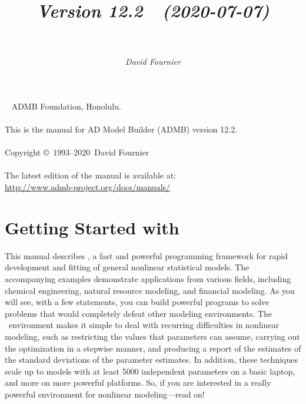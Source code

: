 \documentclass{admbmanual}
\newcommand\admbversion{12.2}
\newcommand\admbyear{2020}
\newcommand\admbdate{2020-07-07}
\begin{document}
\title{%
  \vspace{3ex}\textsf{\textit{Version \admbversion~~(\admbdate)\\[3pt]
      ~%
    }}\vspace{3ex}
}
\author{\textsf{\textit{David Fournier}}}
\maketitle

~\vfill
\noindent ADMB Foundation, Honolulu.\\\\
\noindent This is the manual for AD Model Builder (ADMB) version
\admbversion.\\\\
\noindent Copyright \copyright\ 1993--\admbyear\ David Fournier\\\\
\noindent The latest edition of the manual is available at:\\
\url{http://www.admb-project.org/docs/manuals/}

\tableofcontents

\chapter{Getting Started with \ADM}

This manual describes \ADM, a fast and powerful programming framework for rapid
development and fitting of general nonlinear statistical models. The
accompanying examples demonstrate applications from various
fields, including chemical engineering, natural resource modeling, and financial
modeling. As you will see, with a few statements, you can build powerful
programs to solve problems that would completely defeat other modeling
environments. The \ADM\ environment makes it simple to deal with recurring
difficulties in nonlinear modeling, such as restricting the values that
parameters can assume, carrying out the optimization in a stepwise manner, and
producing a report of the estimates of the standard deviations of the parameter
estimates. In addition, these techniques scale up to models with at least 5000
independent parameters on a basic laptop, and more on more powerful
platforms. So, if you are interested in a really powerful environment for
nonlinear modeling---read on!
\end{document}
